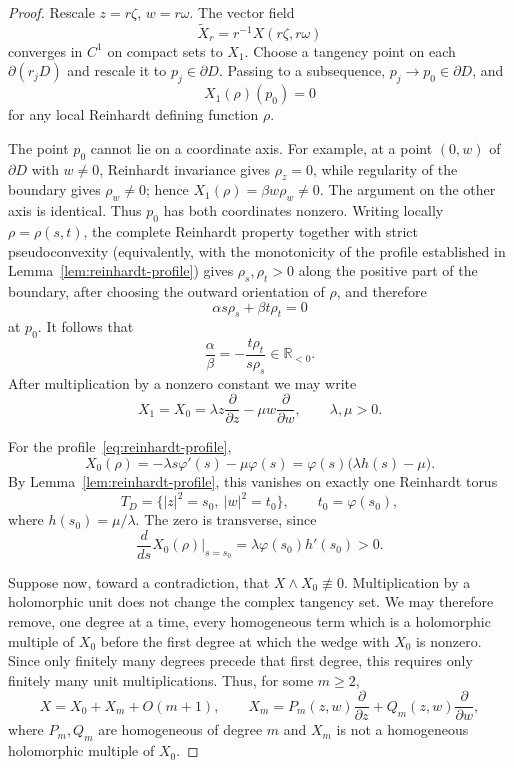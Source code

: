 \documentclass[10pt,a4paper]{amsart}
\newcommand{\R}{\mathbb R}
\newcommand{\pd}{\partial}
\begin{document}
\begin{proof}
Rescale $z=r\zeta$, $w=r\omega$. The vector field
\[
 \widetilde X_r=r^{-1}X(r\zeta,r\omega)
\]
converges in $C^1$ on compact sets to $X_1$. Choose a tangency point on each $\partial(r_jD)$ and rescale it to $p_j\in\partial D$. Passing to a subsequence, $p_j\to p_0\in\partial D$, and
\[
 X_1(\rho)(p_0)=0
\]
for any local Reinhardt defining function $\rho$.

The point $p_0$ cannot lie on a coordinate axis. For example, at a point $(0,w)$ of $\partial D$ with $w\ne0$, Reinhardt invariance gives $\rho_z=0$, while regularity of the boundary gives $\rho_w\ne0$; hence $X_1(\rho)=\beta w\rho_w\ne0$. The argument on the other axis is identical. Thus $p_0$ has both coordinates nonzero. Writing locally $\rho=\rho(s,t)$, the complete Reinhardt property together with strict pseudoconvexity (equivalently, with the monotonicity of the profile established in Lemma~\ref{lem:reinhardt-profile}) gives $\rho_s,\rho_t>0$ along the positive part of the boundary, after choosing the outward orientation of $\rho$, and therefore
\[
 \alpha s\rho_s+\beta t\rho_t=0
\]
at $p_0$. It follows that
\[
 \frac{\alpha}{\beta}=-\frac{t\rho_t}{s\rho_s}\in\R_{<0}.
\]
After multiplication by a nonzero constant we may write
\[
 X_1=X_0=\lambda z\frac{\pd}{\pd z}-\mu w\frac{\pd}{\pd w},
 \qquad \lambda,\mu>0.
\]

For the profile~\eqref{eq:reinhardt-profile},
\begin{equation}\label{eq:linear-reinhardt-tangency}
 X_0(\rho)
 =-\lambda s\varphi'(s)-\mu\varphi(s)
 =\varphi(s)\bigl(\lambda h(s)-\mu\bigr).
\end{equation}
By Lemma~\ref{lem:reinhardt-profile}, this vanishes on exactly one Reinhardt torus
\[
 T_D=\{|z|^2=s_0,\ |w|^2=t_0\},
 \qquad t_0=\varphi(s_0),
\]
where $h(s_0)=\mu/\lambda$. The zero is transverse, since
\begin{equation}\label{eq:transverse-reinhardt-zero}
 \frac{d}{ds}X_0(\rho)\Big|_{s=s_0}
 =\lambda\varphi(s_0)h'(s_0)>0.
\end{equation}

Suppose now, toward a contradiction, that $X\wedge X_0\not\equiv0$. Multiplication by a holomorphic unit does not change the complex tangency set. We may therefore remove, one degree at a time, every homogeneous term which is a holomorphic multiple of $X_0$ before the first degree at which the wedge with $X_0$ is nonzero. Since only finitely many degrees precede that first degree, this requires only finitely many unit multiplications. Thus, for some $m\ge2$,
\[
 X=X_0+X_m+O(m+1),
 \qquad
 X_m=P_m(z,w)\frac{\pd}{\pd z}+Q_m(z,w)\frac{\pd}{\pd w},
\]
where $P_m,Q_m$ are homogeneous of degree $m$ and $X_m$ is not a homogeneous holomorphic multiple of $X_0$.


\end{proof}
\end{document}

